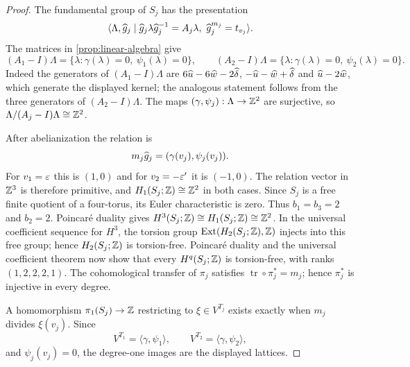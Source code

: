 \begin{proof}
The fundamental group of $S_j$ has the presentation
\[
 \langle\Lambda,\widehat g_j\mid
 \widehat g_j\lambda\widehat g_j^{-1}=A_j\lambda,
 \ \widehat g_j^{m_j}=t_{v_j}\rangle.
\]
The matrices in \cref{prop:linear-algebra} give
\[
 (A_1-I)\Lambda
 =\{\lambda:\gamma(\lambda)=0,
   \ \psi_1(\lambda)=0\},
 \qquad
 (A_2-I)\Lambda
 =\{\lambda:\gamma(\lambda)=0,
   \ \psi_2(\lambda)=0\}.
\]
Indeed the generators of $(A_1-I)\Lambda$ are
$6\widehat u-6\widehat w-2\widehat\delta$,
$-\widehat u-\widehat w+\widehat\delta$ and
$\widehat u-2\widehat w$, which generate the displayed kernel; the analogous
statement follows from the three generators of $(A_2-I)\Lambda$.
The maps $(\gamma,\psi_j):\Lambda\to\mathbb Z^2$ are surjective, so
$\Lambda/(A_j-I)\Lambda\cong\mathbb Z^2$.

After abelianization the relation is
\[
 m_j\widehat g_j=(\gamma(v_j),\psi_j(v_j)).
\]
For $v_1=\varepsilon$ this is $(1,0)$ and for $v_2=-\varepsilon'$ it is $(-1,0)$.
The relation vector in $\mathbb Z^3$ is therefore primitive, and
$H_1(S_j;\mathbb Z)\cong\mathbb Z^2$ in both cases.  Since $S_j$ is a free finite
quotient of a four-torus, its Euler characteristic is zero.  Thus
$b_1=b_3=2$ and $b_2=2$.  Poincaré duality gives
$H^3(S_j;\mathbb Z)\cong H_1(S_j;\mathbb Z)\cong\mathbb Z^2$.  In the universal coefficient
sequence for $H^3$, the torsion group
$\operatorname{Ext}(H_2(S_j;\mathbb Z),\mathbb Z)$ injects into this free group; hence
$H_2(S_j;\mathbb Z)$ is torsion-free.  Poincaré duality and the universal
coefficient theorem now show that every $H^q(S_j;\mathbb Z)$ is torsion-free,
with ranks $(1,2,2,2,1)$.  The cohomological transfer of $\pi_j$ satisfies
$\operatorname{tr}\circ\pi_j^*=m_j$; hence $\pi_j^*$ is injective in every
degree.

A homomorphism $\pi_1(S_j)\to\mathbb Z$ restricting to
$\xi\in V^{T_j}$ exists exactly when $m_j$ divides $\xi(v_j)$.  Since
\[
 V^{T_1}=\langle\gamma,\psi_1\rangle,
 \qquad
 V^{T_2}=\langle\gamma,\psi_2\rangle,
\]
and $\psi_j(v_j)=0$, the degree-one images are the displayed lattices.


\end{proof}
